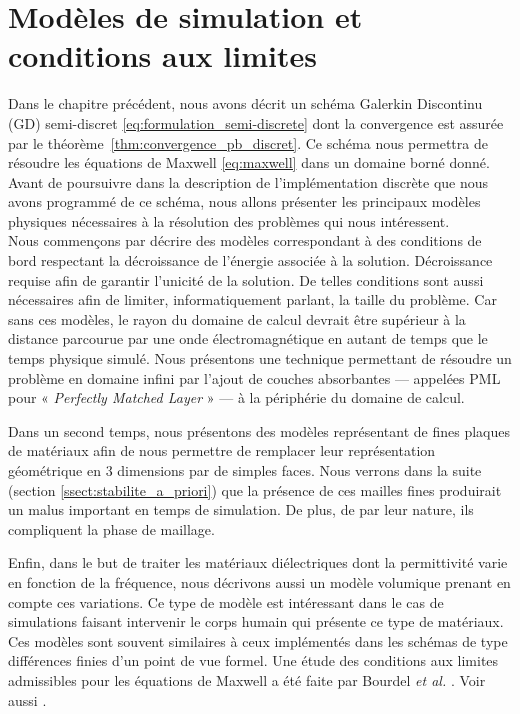 \chapter{Modèles de simulation et conditions aux limites}
\label{chap:modeles}


Dans le chapitre précédent, nous avons décrit un schéma 
Galerkin Discontinu (GD) semi-discret
\eqref{eq:formulation_semi-discrete} dont la convergence est assurée
par le théorème~\ref{thm:convergence_pb_discret}.
Ce schéma nous permettra de résoudre
les équations de Maxwell \eqref{eq:maxwell} dans un domaine borné donné.
Avant de poursuivre dans la description de l'implémentation discrète
que nous avons programmé de ce schéma, nous allons présenter les
principaux modèles physiques nécessaires à la résolution
des problèmes qui nous intéressent.
\\

Nous commençons par décrire des modèles correspondant à des conditions
de bord respectant la décroissance de l’énergie associée à la solution.
Décroissance requise afin de garantir l'unicité de la solution.
De telles conditions sont aussi nécessaires afin de limiter, informatiquement
parlant, la taille du problème. Car sans ces modèles, le rayon
du domaine de calcul devrait être supérieur à la distance parcourue
par une onde électromagnétique en autant de temps que le temps
physique simulé.
Nous présentons une technique permettant de résoudre un problème en domaine infini par l’ajout de couches absorbantes --- appelées PML pour
« \textit{Perfectly Matched Layer} » --- à la périphérie du domaine de calcul.

Dans un second temps, nous présentons des modèles représentant
de fines plaques de matériaux afin de nous permettre de remplacer
leur représentation géométrique en $3$ dimensions par de simples faces.
Nous verrons dans la suite (section \ref{ssect:stabilite_a_priori}) que la présence de ces mailles fines
produirait un malus important en temps de simulation. De plus,
de par leur nature, ils compliquent la phase de maillage.

Enfin, dans le but de traiter les matériaux diélectriques dont la
permittivité varie en fonction de la fréquence, nous décrivons
aussi un modèle volumique prenant en compte ces variations.
Ce type de modèle est intéressant dans le cas de simulations
faisant intervenir le corps humain qui présente ce type de matériaux.
\\

Ces modèles sont souvent similaires à ceux implémentés dans les
schémas de type différences finies d'un point de vue formel.
Une étude des conditions aux limites admissibles pour les équations
de Maxwell a été faite par Bourdel \textit{et al.}
\cite{Bourdel:1991:RNH:138062.138090}. Voir aussi \cite{fornet2012mathematical,crestetto:hal-00731021}.
\\



